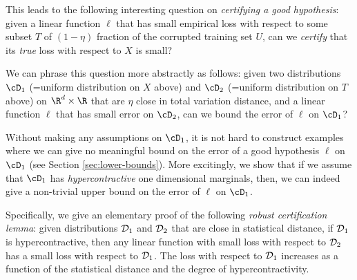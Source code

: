 This leads to the following interesting question on \emph{certifying a good hypothesis}: given a linear function $\ell$ that has small empirical loss with respect to some subset $T$ of $(1-\eta)$ fraction of the corrupted training set $U$, can we {\em certify} that its {\em true} loss with respect to $X$ is small?

We can phrase this question more abstractly as follows: given two distributions $\cD_1$ (=uniform distribution on $X$ above) and $\cD_2$ (=uniform distribution on $T$ above) on $\R^d \times \R$ that are $\eta$ close in total variation distance, and a linear function $\ell$ that has small error on $\cD_2$, can we bound the error of $\ell$ on $\cD_1$? 

Without making any assumptions on $\cD_1$, it is not hard to construct examples where we can give no meaningful bound on the error of a good hypothesis $\ell$ on $\cD_1$ (see Section \ref{sec:lower-bounds}). More excitingly, we show that if we assume that $\cD_1$ has \emph{hypercontractive} one dimensional marginals, then, we can indeed give a non-trivial upper bound on the error of $\ell$ on $\cD_1$. 



Specifically, we give an elementary proof of the following
\emph{robust certification lemma}: given distributions ${\cal D}_1$ and ${\cal D}_2$ that
are close in statistical distance, if ${\cal D}_1$ is
hypercontractive, then any linear function with small loss with
respect to ${\cal D}_2$ has a small loss with respect to
${\cal D}_1$. The loss with respect to ${\cal D}_1$ increases as a
function of the statistical distance and the degree of hypercontractivity.


